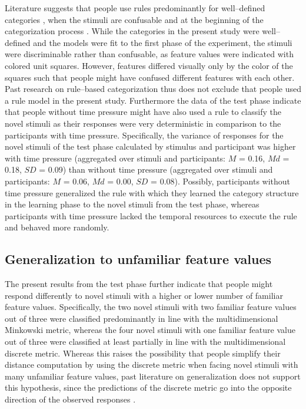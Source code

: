 \documentclass[a4paper,man,natbib]{apa6}
\begin{document}
Literature suggests that people use rules predominantly for well--defined categories \citep{restle1962selection, tom1968attention}, when the stimuli are confusable \citep{rouder2006comparing} and at the beginning of the categorization process \citep{rouder2006comparing}. While the categories in the present study were well--defined and the models were fit to the first phase of the experiment, the stimuli were discriminable rather than confusable, as feature values were indicated with colored unit squares. However, features differed visually only by the color of the squares such that people might have confused different features with each other. 
Past research on rule--based categorization thus does not exclude that people used a rule model in the present study. Furthermore the data of the test phase indicate that people without time pressure might have also used a rule to classify the novel stimuli as their responses were very deterministic in comparison to the participants with time pressure. Specifically, the variance of responses for the novel stimuli of the test phase calculated by stimulus and participant was higher with time pressure (aggregated over stimuli and participants: $M$ = 0.16, $Md$ = 0.18, $SD$ = 0.09) than without time pressure (aggregated over stimuli and participants: $M$ = 0.06, $Md$ = 0.00, $SD$ = 0.08). Possibly, participants without time pressure generalized the rule with which they learned the category structure in the learning phase to the novel stimuli from the test phase, whereas participants with time pressure lacked the temporal resources to execute the rule and behaved more randomly.

\subsection{Generalization to unfamiliar feature values}
The present results from the test phase further indicate that people might respond differently to novel stimuli with a higher or lower number of familiar feature values. Specifically, the two novel stimuli with two familiar feature values out of three were classified predominantly in line with the multidimensional Minkowski metric, whereas the four novel stimuli with one familiar feature value out of three were classified at least partially in line with the multidimensional discrete metric. Whereas this raises the possibility that people simplify their distance computation by using the discrete metric when facing novel stimuli with many unfamiliar feature values, past literature on generalization does not support this hypothesis, since the predictions of the discrete metric go into the opposite direction of the observed responses \citep{erickson2002rule, denton2008rule}.
\end{document}
